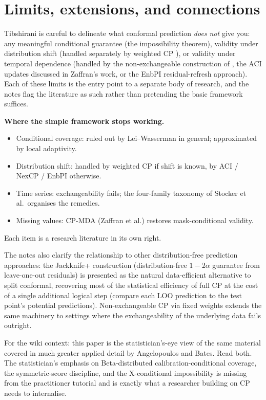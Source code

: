 \documentclass[letterpaper,11pt,leqno]{article}
\newcommand{\bib}{paper.bib}
\begin{document}
\section{Limits, extensions, and connections}\label{s:discussion}

Tibshirani is careful to delineate what conformal prediction \emph{does not} give you: any meaningful conditional guarantee (the impossibility theorem), validity under distribution shift (handled separately by weighted CP \cite{tibshirani2019weighted}), or validity under temporal dependence (handled by the non-exchangeable construction of \cite{barber2023beyond}, the ACI updates discussed in Zaffran's work, or the EnbPI residual-refresh approach). Each of these limits is the entry point to a separate body of research, and the notes flag the literature as such rather than pretending the basic framework suffices.

\begin{explain}
\textbf{Where the simple framework stops working.}
\begin{itemize}
\item Conditional coverage: ruled out by Lei--Wasserman in general; approximated by local adaptivity.
\item Distribution shift: handled by weighted CP if shift is known, by ACI / NexCP / EnbPI otherwise.
\item Time series: exchangeability fails; the four-family taxonomy of Stocker et al.\ organises the remedies.
\item Missing values: CP-MDA (Zaffran et al.) restores mask-conditional validity.
\end{itemize}
Each item is a research literature in its own right.
\end{explain}

The notes also clarify the relationship to other distribution-free prediction approaches: the Jackknife+ construction \cite{barber2021jackknifeplus} (distribution-free $1 - 2\alpha$ guarantee from leave-one-out residuals) is presented as the natural data-efficient alternative to split conformal, recovering most of the statistical efficiency of full CP at the cost of a single additional logical step (compare each LOO prediction to the test point's potential predictions). Non-exchangeable CP via fixed weights \cite{barber2023beyond} extends the same machinery to settings where the exchangeability of the underlying data fails outright.

For the wiki context: this paper is the statistician's-eye view of the same material covered in much greater applied detail by Angelopoulos and Bates. Read both. The statistician's emphasis on Beta-distributed calibration-conditional coverage, the symmetric-score discipline, and the X-conditional impossibility is missing from the practitioner tutorial and is exactly what a researcher building on CP needs to internalise.


\end{document}
